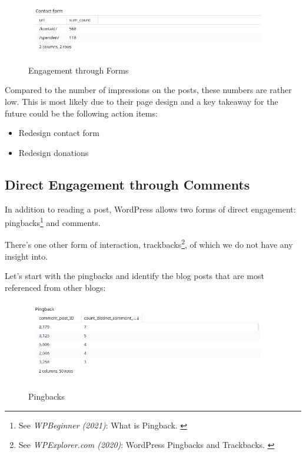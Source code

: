 \begin{figure}[H]
\centering
\caption {Engagement through Forms}
\includegraphics[width=\linewidth]{images/figure14.png}
\label{fig:engagementForms}
\end{figure}

Compared to the number of impressions on the posts, these numbers are rather low. This is most likely due to their page design and a key takeaway for the future could be the following action items:

\begin{itemize}
 \item Redesign contact form
 \item Redesign donations
\end{itemize}

\subsection{Direct Engagement through Comments}

In addition to reading a post, WordPress allows two forms of direct engagement: pingbacks\footnote{See \textit{WPBeginner (2021)}: What is Pingback. \cite{pingBack}} and comments. 

There's one other form of interaction, trackbacks\footnote{See \textit{WPExplorer.com (2020)}: WordPress Pingbacks and Trackbacks. \cite{trackBack}}, of which we do not have any insight into.

Let's start with the pingbacks and identify the blog posts that are most referenced from other blogs:

\begin{figure}[H]
\centering
\caption {Pingbacks}
\includegraphics[width=\linewidth]{images/figure15.png}
\label{fig:pingbacks}
\end{figure}

